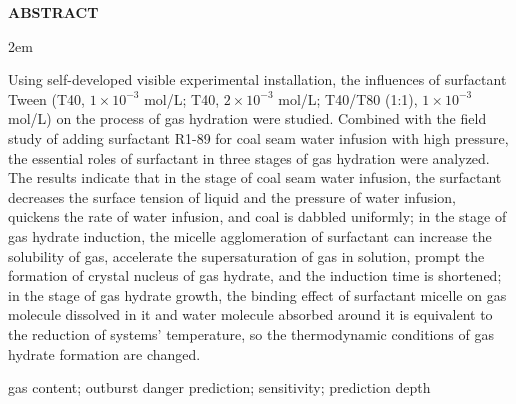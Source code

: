 \begingroup
    \vspace{\baselineskip} 
    \centering
    \songti\bfseries ABSTRACT
    \par
    \vspace{\baselineskip}
\endgroup

\begingroup
    \rmfamily
    \setlength{\baselineskip}{25pt}
    \parindent 2em
    
    Using self-developed visible experimental installation, the influences of surfactant Tween (T40, $1 \times 10^{-3}$ mol/L; T40, $2 \times 10^{-3}$ mol/L; T40/T80 (1:1), $1 \times 10^{-3}$ mol/L) on the process of gas hydration were studied. Combined with the field study of adding surfactant R1-89 for coal seam water infusion with high pressure, the essential roles of surfactant in three stages of gas hydration were analyzed. The results indicate that in the stage of coal seam water infusion, the surfactant decreases the surface tension of liquid and the pressure of water infusion, quickens the rate of water infusion, and coal is dabbled uniformly; in the stage of gas hydrate induction, the micelle agglomeration of surfactant can increase the solubility of gas, accelerate the supersaturation of gas in solution, prompt the formation of crystal nucleus of gas hydrate, and the induction time is shortened; in the stage of gas hydrate growth, the binding effect of surfactant micelle on gas molecule dissolved in it and water molecule absorbed around it is equivalent to the reduction of systems' temperature, so the thermodynamic conditions of gas hydrate formation are changed.
    \par
\endgroup

\vspace{2\baselineskip}

\begingroup
    \noindent 
    \rmfamily gas content; outburst danger prediction; sensitivity; prediction depth
\endgroup
\clearpage